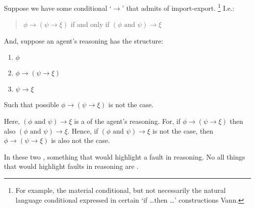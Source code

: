 \begin{note}
  \begin{illustration}
    \label{illu:requ:import-export}
    Suppose we have some conditional `\(\rightarrow\)' that admits of import-export.\nolinebreak
    \footnote{
      For example, the material conditional, but not necessarily the natural language conditional expressed in certain `if \dots then \dots' constructions {\color{red} Vann}.
    }
    I.e.:
    \begin{quote}
      \(\phi \rightarrow (\psi \rightarrow \xi)\) if and only if \((\phi \text{ and } \psi) \rightarrow \xi\)
    \end{quote}
    And, suppose an agent's reasoning has the structure:
    \begin{enumerate}
    \item \(\phi\)
    \item \(\phi \rightarrow (\psi \rightarrow \xi)\)
    \item \(\psi \rightarrow \xi\)
    \end{enumerate}
    Such that possible \(\phi \rightarrow (\psi \rightarrow \xi)\) is not the case.
  \end{illustration}

  Here, \((\phi \text{ and } \psi) \rightarrow \xi\) is a \requ{} of the agent's reasoning.
  For, if \(\phi \rightarrow (\psi \rightarrow \xi)\) then also \((\phi \text{ and } \psi) \rightarrow \xi\).
  Hence, if \((\phi \text{ and } \psi) \rightarrow \xi\) is not the case, then \(\phi \rightarrow (\psi \rightarrow \xi)\) is also not the case.
\end{note}

\begin{note}
  In these two , something that would highlight a fault in reasoning.
  No all things that would highlight faults in reasoning are .
\end{note}

